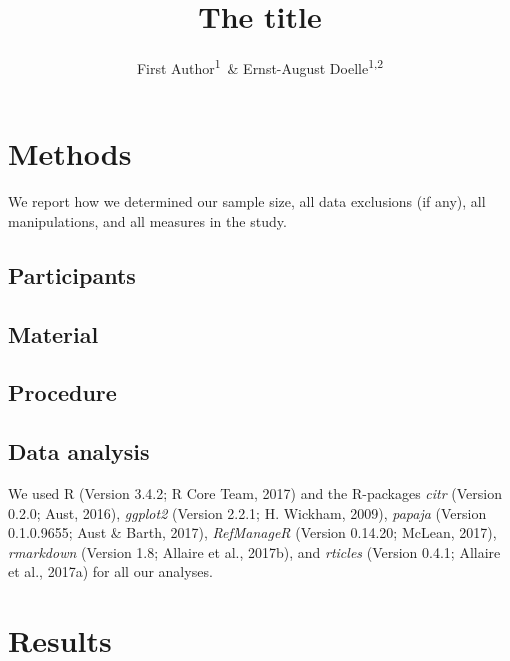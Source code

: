 \documentclass[man]{apa6}
\title{The title}
\author{First Author\textsuperscript{1}~\& Ernst-August Doelle\textsuperscript{1,2}}
\affiliation{
    \vspace{0.5cm}
          \textsuperscript{1} Wilhelm-Wundt-University\\
          \textsuperscript{2} Konstanz Business School  }
\theoremstyle{definition}
\theoremstyle{definition}
\theoremstyle{definition}
\theoremstyle{remark}
\begin{document}
\maketitle

\setcounter{secnumdepth}{0}



\section{Methods}\label{methods}

We report how we determined our sample size, all data exclusions (if
any), all manipulations, and all measures in the study.

\subsection{Participants}\label{participants}

\subsection{Material}\label{material}

\subsection{Procedure}\label{procedure}

\subsection{Data analysis}\label{data-analysis}

We used R (Version 3.4.2; R Core Team, 2017) and the R-packages
\emph{citr} (Version 0.2.0; Aust, 2016), \emph{ggplot2} (Version 2.2.1;
H. Wickham, 2009), \emph{papaja} (Version 0.1.0.9655; Aust \& Barth,
2017), \emph{RefManageR} (Version 0.14.20; McLean, 2017),
\emph{rmarkdown} (Version 1.8; Allaire et al., 2017b), and
\emph{rticles} (Version 0.4.1; Allaire et al., 2017a) for all our
analyses.

\section{Results}\label{results}
\end{document}
